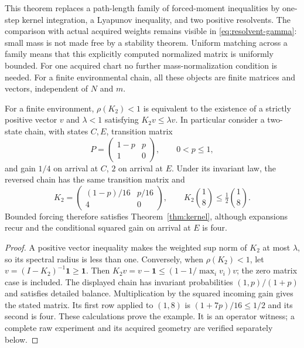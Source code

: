 This theorem replaces a path-length family of forced-moment inequalities by one-step kernel integration, a Lyapunov inequality, and two positive resolvents. The comparison with actual acquired weights remains visible in \eqref{eq:resolvent-gamma}: small mass is not made free by a stability theorem. Uniform matching across a family means that this explicitly computed normalized matrix is uniformly bounded. For one acquired chart no further mass-normalization condition is needed. For a finite environmental chain, all these objects are finite matrices and vectors, independent of $N$ and $m$.

\begin{corollary}\label{cor:finite-kernel}
For a finite environment, $\rho(K_2)<1$ is equivalent to the existence of a strictly positive vector $v$ and $\lambda<1$ satisfying $K_2v\le\lambda v$. In particular consider a two-state chain, with states $C,E$, transition matrix
\[
 P=\begin{pmatrix}1-p&p\\1&0\end{pmatrix},\qquad 0<p\le1,
\]
and gain $1/4$ on arrival at $C$, $2$ on arrival at $E$. Under its invariant law, the reversed chain has the same transition matrix and
\[
 K_2=\begin{pmatrix}(1-p)/16&p/16\\4&0\end{pmatrix},
 \qquad K_2\binom{1}{8}\le\tfrac12\binom{1}{8}.
\]
Bounded forcing therefore satisfies Theorem~\ref{thm:kernel}, although expansions recur and the conditional squared gain on arrival at $E$ is four.
\end{corollary}
\begin{proof}
A positive vector inequality makes the weighted sup norm of $K_2$ at most $\lambda$, so its spectral radius is less than one. Conversely, when $\rho(K_2)<1$, let $v=(I-K_2)^{-1}\mathbf1\ge\mathbf1$. Then $K_2v=v-\mathbf1\le(1-1/\max_i v_i)v$; the zero matrix case is included. The displayed chain has invariant probabilities $(1,p)/(1+p)$ and satisfies detailed balance. Multiplication by the squared incoming gain gives the stated matrix. Its first row applied to $(1,8)$ is $(1+7p)/16\le1/2$ and its second is four. These calculations prove the example. It is an operator witness; a complete raw experiment and its acquired geometry are verified separately below.
\end{proof}

